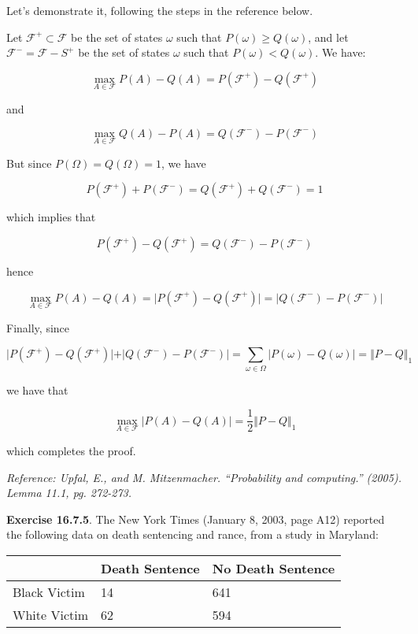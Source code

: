{Let's demonstrate it, following the steps in the reference below.

Let \(\mathcal{F}^+ \subset \mathcal{F}\) be the set of states
\(\omega\) such that \(P(\omega) \geq Q(\omega)\), and let
\(\mathcal{F}^- = \mathcal{F} - S^+\) be the set of states \(\omega\)
such that \(P(\omega) < Q(\omega)\). We have:

\[ \max_{A \in \mathcal{F}} P(A) - Q(A) = P(\mathcal{F}^+) - Q(\mathcal{F}^+)\]

and

\[ \max_{A \in \mathcal{F}} Q(A) - P(A) = Q(\mathcal{F}^-) - P(\mathcal{F}^-)\]

But since \(P(\Omega) = Q(\Omega) = 1\), we have

\[ P(\mathcal{F}^+) + P(\mathcal{F}^-) = Q(\mathcal{F}^+) + Q(\mathcal{F}^-) = 1 \]

which implies that

\[ P(\mathcal{F}^+) - Q(\mathcal{F}^+) = Q(\mathcal{F}^-) - P(\mathcal{F}^-)\]

hence

\[ \max_{A \in \mathcal{F}} P(A) - Q(A) = \vert P(\mathcal{F}^+) - Q(\mathcal{F}^+) \vert = \vert Q(\mathcal{F}^-) - P(\mathcal{F}^-) \vert \]

Finally, since

\[ 
\vert P(\mathcal{F}^+) - Q(\mathcal{F}^+) \vert + \vert Q(\mathcal{F}^-) - P(\mathcal{F}^-) \vert = \sum_{\omega \in \Omega} | P(\omega) - Q(\omega) | = \Vert P - Q \Vert_1
\]

we have that

\[ \max_{A \in \mathcal{F}} |P(A) - Q(A)| = \frac{1}{2} \Vert P - Q \Vert_1 \]

which completes the proof.

\emph{Reference: Upfal, E., and M. Mitzenmacher. ``Probability and
computing.'' (2005). Lemma 11.1, pg. 272-273.}

\textbf{Exercise 16.7.5}. The New York Times (January 8, 2003, page A12)
reported the following data on death sentencing and rance, from a study
in Maryland:

\begin{longtable}[]{@{}lll@{}}
\toprule\noalign{}
& Death Sentence & No Death Sentence \\
\midrule\noalign{}
\endhead
\bottomrule\noalign{}
\endlastfoot
Black Victim & 14 & 641 \\
White Victim & 62 & 594 \\
\end{longtable}

}
